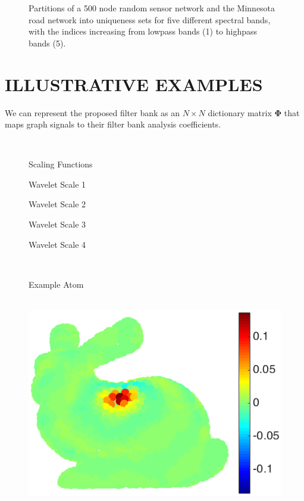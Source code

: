 \documentclass{article}
\begin{document}
\begin{figure}[tb]
\begin{minipage}[m]{0.47\linewidth}
\end{minipage}
\caption{Partitions of a 500 node random sensor network and the Minnesota road network \cite{gleich} into uniqueness sets for five different spectral bands, with the indices increasing from lowpass bands (1) to highpass bands (5).} \label{Fig:part_examples}
\end{figure} 

\section{ILLUSTRATIVE EXAMPLES}
We can represent the proposed filter bank as an $N \times N$ dictionary matrix $\boldsymbol{\Phi}$ that maps graph signals to their filter bank analysis coefficients. 

\begin{figure}[bth] 
\begin{minipage}[m]{0.16\linewidth}
~
\end{minipage}
\begin{minipage}[m]{0.16\linewidth}
\centerline{\small{Scaling Functions}}
\end{minipage}
\hspace{.01\linewidth}
\begin{minipage}[m]{0.16\linewidth}
\centerline{\small{Wavelet Scale 1~~~~}}
\end{minipage}
\begin{minipage}[m]{0.16\linewidth}
\centerline{\small{Wavelet Scale 2~~~~}}\end{minipage}
\begin{minipage}[m]{0.16\linewidth}
\centerline{\small{Wavelet Scale 3~~~~}}\end{minipage}
\begin{minipage}[m]{0.16\linewidth}
\centerline{\small{Wavelet Scale 4~~~~~}}\end{minipage} \\
\begin{minipage}[m]{0.16\linewidth}
\centerline{\small{Example Atom}}
\end{minipage}
\begin{minipage}[m]{0.16\linewidth}
\centerline{~~\includegraphics[width=.85\linewidth]{fig_bunny_atom_scalinga}}

\end{minipage}
\end{figure}
\end{document}
